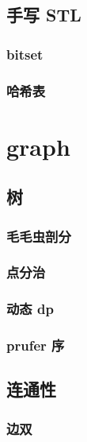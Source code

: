 \documentclass[12pt]{ctexart}
\begin{document}
\subsection{手写 STL}

\subsubsection{bitset}



\subsubsection{哈希表}



\newpage

\section{graph}

\subsection{树}

\subsubsection{毛毛虫剖分}



\subsubsection{点分治}

\subsubsection{动态 dp}

\subsubsection{prufer 序}

\subsection{连通性}

\subsubsection{边双}
\end{document}
